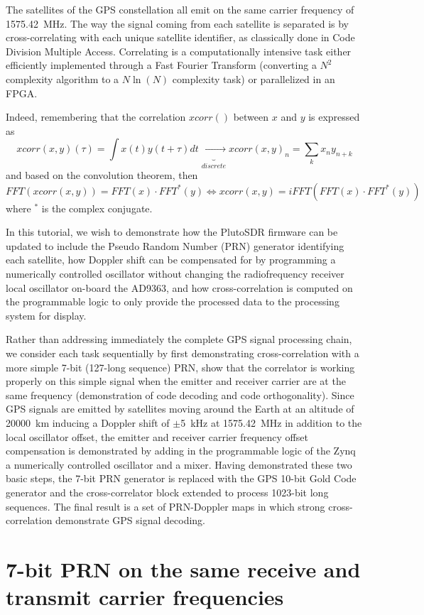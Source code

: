 \documentclass{article}
\begin{document}
The satellites of the GPS constellation all emit on the same carrier frequency of 1575.42~MHz. The
way the signal coming from each satellite is separated is by cross-correlating with each unique
satellite identifier, as classically done in Code Division Multiple Access. Correlating is 
a computationally intensive task either efficiently implemented through a Fast Fourier
Transform (converting a $N^2$ complexity algorithm to a $N\ln(N)$ complexity task) or parallelized
in an FPGA. 

Indeed, remembering that the correlation $xcorr()$ between $x$ and $y$ is expressed as
$$xcorr(x,y)(\tau)=\int x(t)y(t+\tau)dt\underbrace{\longrightarrow}_{discrete}xcorr(x,y)_n=\sum_k x_ny_{n+k}$$
and based on the convolution theorem, then 
$$FFT(xcorr(x,y))=FFT(x)\cdot FFT^*(y)\Leftrightarrow
xcorr(x,y)=iFFT\left(FFT(x)\cdot FFT^*(y)\right)$$ where $^*$ is the complex conjugate.

In this tutorial, we wish to demonstrate how the PlutoSDR firmware can be updated 
to include the Pseudo Random Number (PRN) generator identifying each satellite, how Doppler
shift can be compensated for by programming a numerically controlled oscillator without changing
the radiofrequency receiver local oscillator on-board the AD9363, and how cross-correlation is
computed on the programmable logic to only provide the processed data to the processing system
for display.

Rather than addressing immediately the complete GPS signal processing chain, we consider each
task sequentially by first demonstrating cross-correlation with a more simple 7-bit (127-long
sequence) PRN, show that the correlator is working properly on this simple signal when the emitter
and receiver carrier are at the same frequency (demonstration of code decoding and code 
orthogonality). Since GPS signals are emitted by satellites moving around the Earth at an
altitude of 20000~km inducing a Doppler shift of $\pm$5~kHz at 1575.42~MHz in addition to the
local oscillator offset, the emitter and receiver carrier frequency offset compensation is
demonstrated by adding in the programmable logic of the Zynq a numerically controlled oscillator
and a mixer. Having demonstrated these two basic steps, the 7-bit PRN generator is replaced
with the GPS 10-bit Gold Code generator and the cross-correlator block extended to process
1023-bit long sequences. The final result is a set of PRN-Doppler maps in which strong cross-correlation
demonstrate GPS signal decoding.

\section{7-bit PRN on the same receive and transmit carrier frequencies}
\end{document}
